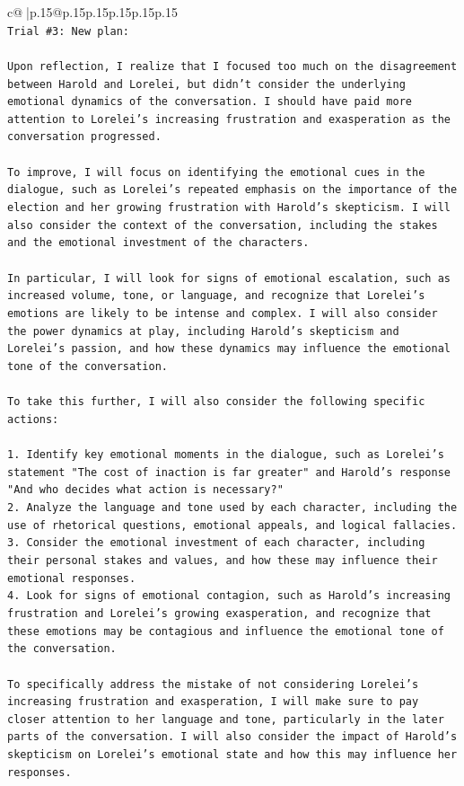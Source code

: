 \documentclass{article}
\begin{document}
{\begin{supertabular}{c@{$\;$}|p{.15\linewidth}@{}p{.15\linewidth}p{.15\linewidth}p{.15\linewidth}p{.15\linewidth}p{.15\linewidth}}
{{{\\ 
\texttt{Trial \#3: New plan: } \\
\\ 
\texttt{Upon reflection, I realize that I focused too much on the disagreement between Harold and Lorelei, but didn't consider the underlying emotional dynamics of the conversation. I should have paid more attention to Lorelei's increasing frustration and exasperation as the conversation progressed. } \\
\\ 
\texttt{To improve, I will focus on identifying the emotional cues in the dialogue, such as Lorelei's repeated emphasis on the importance of the election and her growing frustration with Harold's skepticism. I will also consider the context of the conversation, including the stakes and the emotional investment of the characters.} \\
\\ 
\texttt{In particular, I will look for signs of emotional escalation, such as increased volume, tone, or language, and recognize that Lorelei's emotions are likely to be intense and complex. I will also consider the power dynamics at play, including Harold's skepticism and Lorelei's passion, and how these dynamics may influence the emotional tone of the conversation.} \\
\\ 
\texttt{To take this further, I will also consider the following specific actions:} \\
\\ 
\texttt{1. Identify key emotional moments in the dialogue, such as Lorelei's statement "The cost of inaction is far greater" and Harold's response "And who decides what action is necessary?"} \\
\texttt{2. Analyze the language and tone used by each character, including the use of rhetorical questions, emotional appeals, and logical fallacies.} \\
\texttt{3. Consider the emotional investment of each character, including their personal stakes and values, and how these may influence their emotional responses.} \\
\texttt{4. Look for signs of emotional contagion, such as Harold's increasing frustration and Lorelei's growing exasperation, and recognize that these emotions may be contagious and influence the emotional tone of the conversation.} \\
\\ 
\texttt{To specifically address the mistake of not considering Lorelei's increasing frustration and exasperation, I will make sure to pay closer attention to her language and tone, particularly in the later parts of the conversation. I will also consider the impact of Harold's skepticism on Lorelei's emotional state and how this may influence her responses.} \\
}}}
\end{supertabular}}
\end{document}
